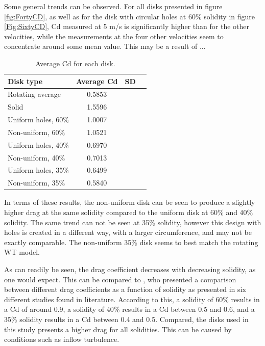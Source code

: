 Some general trends can be observed. For all disks presented in figure \ref{fig:FortyCD}, as well as for the disk with circular holes at 60\% solidity in figure \ref{Fig:SixtyCD}, Cd measured at 5 m/s is significantly higher than for the other velocities, while the measurements at the four other velocities seem to concentrate around some mean value. This may be a result of ... 


\begin{table}[H]
    \centering
    \begin{tabular}{l c c r}
         Disk type & Average Cd & SD \\
         \hline
         Rotating average & 0.5853 &  \\
         Solid & 1.5596 &  \\
         Uniform holes, 60\% & 1.0007 & \\
         Non-uniform, 60\% & 1.0521 &  \\
         Uniform holes, 40\% & 0.6970 &  \\
         Non-uniform, 40\% & 0.7013 &  \\
         Uniform holes, 35\% & 0.6499 & \\
         Non-uniform, 35\% & 0.5840 &  \\
    \end{tabular}
    \caption{Average Cd for each disk.}
    \label{tab:AvgCD}
\end{table}


In terms of these results, the non-uniform disk can be seen to produce a slightly higher drag at the same solidity compared to the uniform disk at 60\% and 40\% solidity. The same trend can not be seen at 35\% solidity, however this design with holes is created in a different way, with a larger circumference, and may not be exactly comparable. The non-uniform 35\% disk seems to best match the rotating WT model. 

As can readily be seen, the drag coefficient decreases with decreasing solidity, as one would expect. This can be compared to \cite{Lignarolo2016}, who presented a comparison between different drag coefficients as a function of solidity as presented in six different studies found in literature. According to this, a solidity of 60\% results in a Cd of around 0.9, a solidity of 40\% results in a Cd between 0.5 and 0.6, and a 35\% solidity results in a Cd between 0.4 and 0.5. Compared, the disks used in this study presents a higher drag for all solidities. This can be caused by conditions such as inflow turbulence. 

